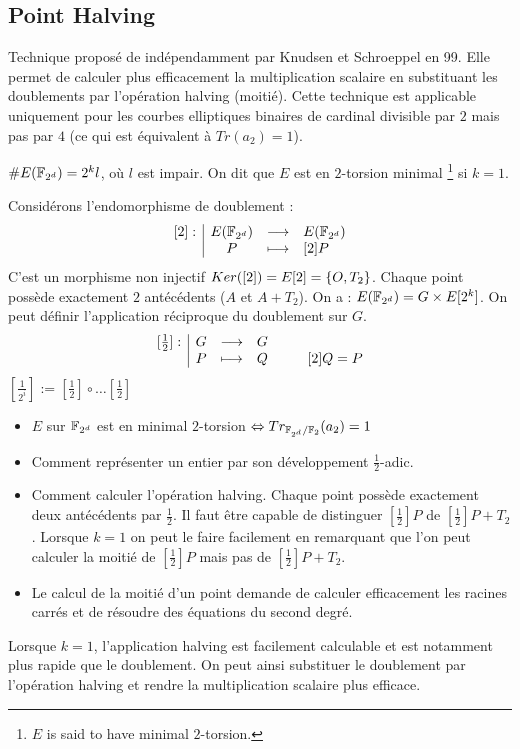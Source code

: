 \documentclass[a4paper]{report}
\begin{document}
\subsection{Point Halving}
Technique proposé de indépendamment par Knudsen et Schroeppel en 99. Elle permet de calculer plus efficacement la multiplication scalaire en substituant les doublements par l'opération halving (moitié). Cette technique est applicable uniquement pour les courbes elliptiques binaires de cardinal divisible par $2$ mais pas par $4$ (ce qui est équivalent à $Tr(a_2) = 1$).

$\# E(\mathbb{F}_{2^d}) = 2^k l$, où $l$ est impair. On dit que $E$ est en $2$-torsion minimal \footnote{$E$ is said to have minimal $2$-torsion.} si $k=1$. 

Considérons l'endomorphisme de doublement :
$$\begin{array}{l|ccl} [2]: & E(\mathbb{F}_{2^d}) & \longrightarrow & E(\mathbb{F}_{2^d}) \\ & P & \longmapsto & [2]P \end{array}$$
C'est un morphisme non injectif $Ker([2]) = E[2] = \{ O{}, T_2\}$. Chaque point possède exactement $2$ antécédents ($A$ et $A + T_2$).
On a : $E(\mathbb{F}_{2^d}) = G \times E[2^k]$. On peut définir l'application réciproque du doublement sur $G$.
$$\begin{array}{l|ccl} [\frac{1}{2}]: & G & \longrightarrow & G \\ & P & \longmapsto & Q \hspace{1cm} [2]Q = P \end{array}$$
$[\frac{1}{2^i}] := [\frac{1}{2}] \circ \ldots [\frac{1}{2}]$

\begin{itemize}[label=$\bullet$]
    \item $E$ sur $\mathbb{F}_{2^d}$ est en minimal $2$-torsion $\Leftrightarrow Tr_{\mathbb{F}_{2^d}/\mathbb{F}_{2}}(a_2) = 1$
    \item Comment représenter un entier par son développement $\frac{1}{2}$-adic.
    \item Comment calculer l'opération halving. Chaque point possède exactement deux antécédents par $\frac{1}{2}$. Il faut être capable de distinguer $[\frac{1}{2}]P$ de $[\frac{1}{2}]P + T_2$. Lorsque $k=1$ on peut le faire facilement en remarquant que l'on peut calculer la moitié de $[\frac{1}{2}]P$ mais pas de $[\frac{1}{2}]P + T_2$. 
    \item Le calcul de la moitié d'un point demande de calculer efficacement les racines carrés et de résoudre des équations du second degré.
    \end{itemize}
    Lorsque $k=1$, l'application halving est facilement calculable et est notamment plus rapide que le doublement. On peut ainsi substituer le doublement par l'opération halving et rendre la multiplication scalaire plus efficace.
\end{document}
